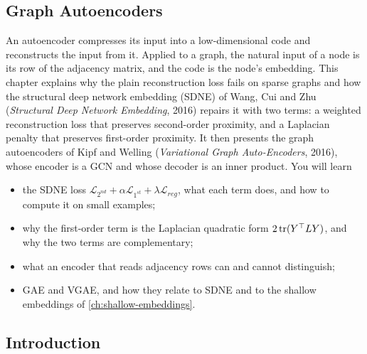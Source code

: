 \begin{notechapter}
\forgetcs\hadamard\newcommand{\hadamard}{\odot}
\chapter{Graph Autoencoders}\label{ch:graph-autoencoders}

\begin{chapterintro}
An autoencoder compresses its input into a low-dimensional code and reconstructs the input from it. Applied to a graph, the natural input of a node is its row of the adjacency matrix, and the code is the node's embedding. This chapter explains why the plain reconstruction loss fails on sparse graphs and how the structural deep network embedding (SDNE) of Wang, Cui and Zhu (\emph{Structural Deep Network Embedding}, 2016) repairs it with two terms: a weighted reconstruction loss that preserves second-order proximity, and a Laplacian penalty that preserves first-order proximity. It then presents the graph autoencoders of Kipf and Welling (\emph{Variational Graph Auto-Encoders}, 2016), whose encoder is a GCN and whose decoder is an inner product. You will learn
\begin{itemize}[nosep]
  \item the SDNE loss $\mathcal L_{2^{nd}} + \alpha\mathcal L_{1^{st}} + \lambda\mathcal L_{reg}$, what each term does, and how to compute it on small examples;
  \item why the first-order term is the Laplacian quadratic form $2\operatorname{tr}(Y^\top LY)$, and why the two terms are complementary;
  \item what an encoder that reads adjacency rows can and cannot distinguish;
  \item GAE and VGAE, and how they relate to SDNE and to the shallow embeddings of \cref{ch:shallow-embeddings}.
\end{itemize}
\end{chapterintro}

\section{Introduction}


\end{notechapter}
